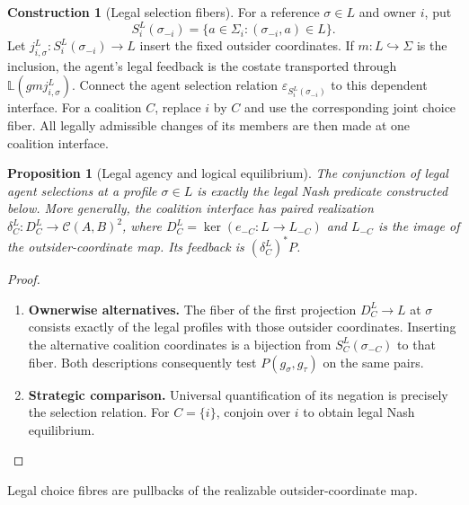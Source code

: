\documentclass[11pt,a4paper]{article}
\numberwithin{equation}{section}
\newtheorem{proposition}[theorem]{Proposition}
\theoremstyle{definition}
\newtheorem{construction}[construction]{Construction}
\theoremstyle{remark}
\theoremstyle{plain}
\begin{document}
\begin{construction}[Legal selection fibers]
\label{con:cgt-dependent-agency}
For a reference $\sigma\in L$ and owner $i$, put
\[
 S_i^L(\sigma_{-i})
 =\{a\in\Sigma_i:(\sigma_{-i},a)\in L\}.
\]
Let $j^L_{i,\sigma}:S_i^L(\sigma_{-i})\to L$ insert the fixed
outsider coordinates. If $m:L\hookrightarrow\Sigma$ is the inclusion,
the agent's legal feedback is the costate transported through
$\mathbb L(gmj^L_{i,\sigma})$. Connect the agent selection relation
$\varepsilon_{S_i^L(\sigma_{-i})}$ to this dependent interface.
For a coalition $C$, replace $i$ by $C$ and use the corresponding
joint choice fiber. All legally admissible changes of its members are
then made at one coalition interface.
\end{construction}

\begin{proposition}[Legal agency and logical equilibrium]
\label{prop:cgt-dependent-selection}
The conjunction of legal agent selections at a profile $\sigma\in L$
is exactly the legal Nash predicate constructed below. More generally,
the coalition interface has paired realization
$\delta_C^L:D_C^L\to\mathcal C(A,B)^2$, where
$D_C^L=\ker(e_{-C}:L\to L_{-C})$ and $L_{-C}$ is the image of the
outsider-coordinate map. Its feedback is $(\delta_C^L)^*P$.
\end{proposition}
\begin{proof}
\leavevmode
\begin{enumerate}[label=\textup{(\arabic*)},leftmargin=*,itemsep=4pt,topsep=3pt]
  \item \textbf{Ownerwise alternatives.} The fiber of the first projection $D_C^L\to L$ at $\sigma$ consists
exactly of the legal profiles with those outsider coordinates. Inserting
the alternative coalition coordinates is a bijection from
$S_C^L(\sigma_{-C})$ to that fiber. Both descriptions consequently test
$P(g_\sigma,g_\tau)$ on the same pairs.
  \item \textbf{Strategic comparison.} Universal quantification of its
negation is precisely the selection relation. For $C=\{i\}$, conjoin
over $i$ to obtain legal Nash equilibrium.
\end{enumerate}
\end{proof}

\noindent Legal choice fibres are pullbacks of the realizable outsider-coordinate map.
\begin{center}
\end{center}
\end{document}
